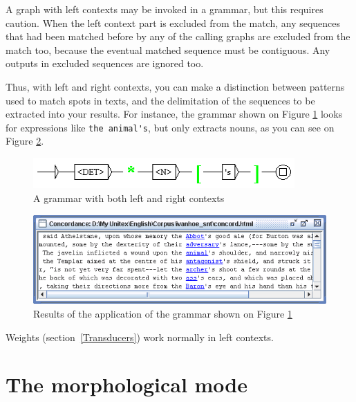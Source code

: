 \bigskip
\noindent A graph with left contexts may be invoked in a grammar, but this requires caution.
When the left context part is excluded from the match, any sequences that had been matched before by 
any of the calling graphs are excluded from the match too, because the eventual matched sequence must be contiguous.
Any outputs in excluded sequences are ignored too.

\bigskip
\noindent Thus, with left and right contexts, you can make a distinction between
patterns used to match spots in texts, and the delimitation of the sequences to be extracted into your
results. For instance, the grammar shown on Figure \ref{fig-left-context9} looks
for expressions like \verb$the animal's$, but only extracts nouns, as you can
see on Figure \ref{fig-left-context10}.

\begin{figure}[!ht]
\begin{center}
\includegraphics[width=10cm]{resources/img/fig6-17i.png}
\caption{A grammar with both left and right contexts\label{fig-left-context9}}
\end{center}
\end{figure}

\begin{figure}[!ht]
\begin{center}
\includegraphics[width=15cm]{resources/img/fig6-17j.png}
\caption{Results of the application of the grammar shown on Figure
\ref{fig-left-context9}\label{fig-left-context10}}
\end{center}
\end{figure}

\bigskip
\noindent Weights (section~\ref{Transducers}) work normally in left contexts.

\clearpage

\section{The morphological mode}
\label{section-morphological-mode}

